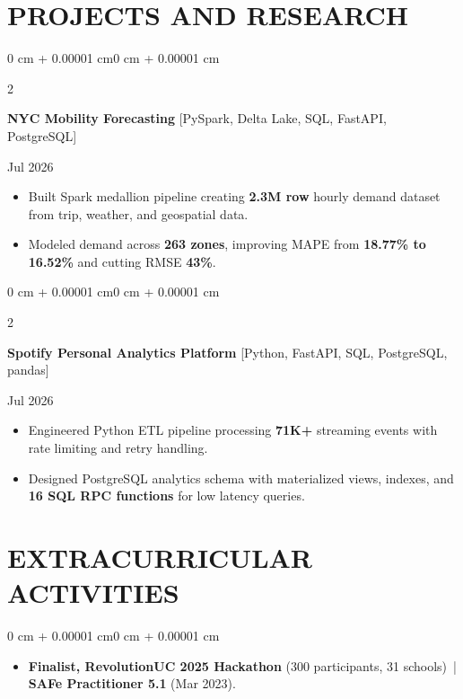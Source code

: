 \documentclass[10pt, letterpaper]{article}
\newenvironment{highlights}{
    \begin{itemize}[
        topsep=0.10 cm,
        parsep=0.06 cm,
        partopsep=0pt,
        itemsep=0.06 cm,
        leftmargin=12pt
    ]
}{
    \end{itemize}
}
\newenvironment{onecolentry}{
    \begin{adjustwidth}{0 cm + 0.00001 cm}{0 cm + 0.00001 cm}
}{
    \end{adjustwidth}
}
\newenvironment{twocolentry}[2][]{
    \onecolentry
    \def\secondColumn{#2}
    \setcolumnwidth{\fill, 4.5 cm}
    \begin{paracol}{2}
}{
    \switchcolumn \raggedleft \secondColumn
    \end{paracol}
    \endonecolentry
}
\begin{document}
\section{PROJECTS AND RESEARCH}
\begin{twocolentry}{Jul 2026}
\textbf{NYC Mobility Forecasting} [PySpark, Delta Lake, SQL, FastAPI, PostgreSQL]
\end{twocolentry}
\begin{highlights}
  \item Built Spark medallion pipeline creating \textbf{2.3M row} hourly demand dataset from trip, weather, and geospatial data.
  \item Modeled demand across \textbf{263 zones}, improving MAPE from \textbf{18.77\% to 16.52\%} and cutting RMSE \textbf{43\%}.
\end{highlights}

\vspace{0.12 cm}

\begin{twocolentry}{Jul 2026}
\textbf{Spotify Personal Analytics Platform} [Python, FastAPI, SQL, PostgreSQL, pandas]
\end{twocolentry}
\begin{highlights}
  \item Engineered Python ETL pipeline processing \textbf{71K+} streaming events with rate limiting and retry handling.
  \item Designed PostgreSQL analytics schema with materialized views, indexes, and \textbf{16 SQL RPC functions} for low latency queries.
\end{highlights}

\section{EXTRACURRICULAR ACTIVITIES}
\begin{onecolentry}
\begin{highlights}
  \item \textbf{Finalist, RevolutionUC 2025 Hackathon} (300 participants, 31 schools) \,|\, \textbf{SAFe Practitioner 5.1} (Mar 2023).
\end{highlights}
\end{onecolentry}
\end{document}
